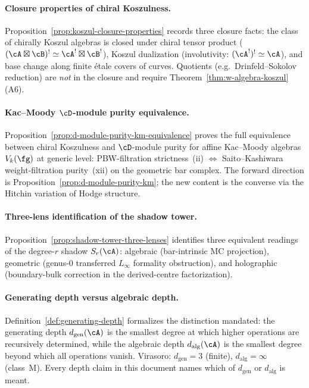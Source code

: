 \paragraph{Closure properties of chiral Koszulness.}
Proposition~\ref{prop:koszul-closure-properties} records
three closure facts: the class of chirally Koszul
algebras is closed under chiral tensor product
($(\cA \boxtimes \cB)^! \simeq \cA^! \boxtimes \cB^!$),
Koszul dualization (involutivity: $(\cA^!)^! \simeq \cA$),
and base change along finite \'etale covers of curves.
Quotients (e.g.\ Drinfeld--Sokolov reduction) are
\emph{not} in the closure and require
Theorem~\ref{thm:w-algebra-koszul} (A6).

\paragraph{Kac--Moody $\cD$-module purity equivalence.}
Proposition~\ref{prop:d-module-purity-km-equivalence}
proves the full equivalence between chiral Koszulness and
$\cD$-module purity for affine Kac--Moody algebras $V_k(\fg)$
at generic level: PBW-filtration strictness~(ii) $\iff$
Saito--Kashiwara weight-filtration purity~(xii) on the
geometric bar complex. The forward direction is
Proposition~\ref{prop:d-module-purity-km}; the new content
is the converse via the Hitchin variation of Hodge structure.

\paragraph{Three-lens identification of the shadow tower.}
Proposition~\ref{prop:shadow-tower-three-lenses} identifies
three equivalent readings of the degree-$r$ shadow
$S_r(\cA)$: algebraic (bar-intrinsic MC projection),
geometric (genus-$0$ transferred $L_\infty$ formality
obstruction), and holographic (boundary-bulk correction
in the derived-centre factorization).

\paragraph{Generating depth versus algebraic depth.}
Definition~\ref{def:generating-depth} formalizes the
distinction mandated: the generating depth
$d_{\mathrm{gen}}(\cA)$ is the smallest degree at which
higher operations are recursively determined, while the
algebraic depth $d_{\mathrm{alg}}(\cA)$ is the smallest
degree beyond which all operations vanish. Virasoro:
$d_{\mathrm{gen}} = 3$ (finite), $d_{\mathrm{alg}} = \infty$
(class~M). Every depth claim in this document names which of
$d_{\mathrm{gen}}$ or $d_{\mathrm{alg}}$ is meant.

